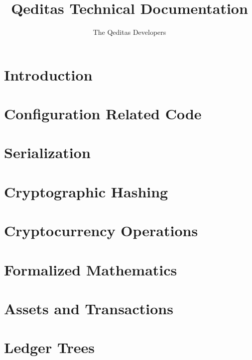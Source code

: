 \documentclass{book}
\title{Qeditas Technical Documentation}
\author{The Qeditas Developers}
\begin{document}
\maketitle

\tableofcontents

\chapter{Introduction}



\chapter{Configuration Related Code}\label{chap:config}



\chapter{Serialization}\label{chap:ser}



\chapter{Cryptographic Hashing}\label{chap:hash}



\chapter{Cryptocurrency Operations}\label{chap:cryptocurr}



\chapter{Formalized Mathematics}\label{chap:math}



\chapter{Assets and Transactions}\label{chap:assetstx}



\chapter{Ledger Trees}\label{chap:ctre}
\end{document}
